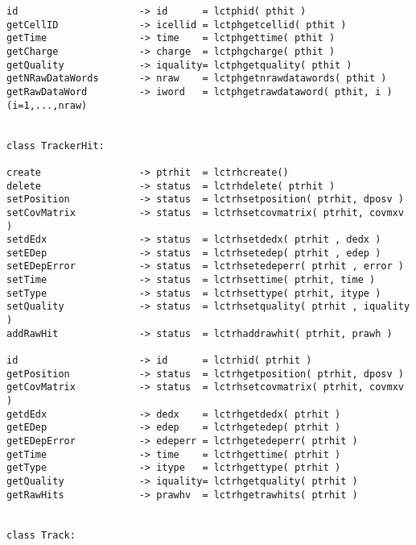 \begin{scriptsize}
\begin{verbatim}
id                     -> id      = lctphid( pthit )
getCellID              -> icellid = lctphgetcellid( pthit )
getTime                -> time    = lctphgettime( pthit )
getCharge              -> charge  = lctphgcharge( pthit )
getQuality             -> iquality= lctphgetquality( pthit )
getNRawDataWords       -> nraw    = lctphgetnrawdatawords( pthit )
getRawDataWord         -> iword   = lctphgetrawdataword( pthit, i )  (i=1,...,nraw)


class TrackerHit:

create                 -> ptrhit  = lctrhcreate()
delete                 -> status  = lctrhdelete( ptrhit )
setPosition            -> status  = lctrhsetposition( ptrhit, dposv )
setCovMatrix           -> status  = lctrhsetcovmatrix( ptrhit, covmxv )
setdEdx                -> status  = lctrhsetdedx( ptrhit , dedx )
setEDep                -> status  = lctrhsetedep( ptrhit , edep )
setEDepError           -> status  = lctrhsetedeperr( ptrhit , error )
setTime                -> status  = lctrhsettime( ptrhit, time )
setType                -> status  = lctrhsettype( ptrhit, itype )
setQuality             -> status  = lctrhsetquality( ptrhit , iquality )
addRawHit              -> status  = lctrhaddrawhit( ptrhit, prawh )

id                     -> id      = lctrhid( ptrhit )
getPosition            -> status  = lctrhgetposition( ptrhit, dposv )
getCovMatrix           -> status  = lctrhsetcovmatrix( ptrhit, covmxv )
getdEdx                -> dedx    = lctrhgetdedx( ptrhit )
getEDep                -> edep    = lctrhgetedep( ptrhit )
getEDepError           -> edeperr = lctrhgetedeperr( ptrhit )
getTime                -> time    = lctrhgettime( ptrhit )
getType                -> itype   = lctrhgettype( ptrhit )
getQuality             -> iquality= lctrhgetquality( ptrhit )
getRawHits             -> prawhv  = lctrhgetrawhits( ptrhit )


class Track:


\end{verbatim}
\end{scriptsize}
